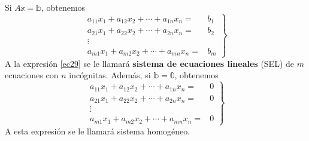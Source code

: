 \begin{definition}
    Si $A\mathbb{x} = \mathbb{b}$, obtenemos
    \begin{equation}
        \left. \begin{array}{rl}
            a_{11}x_1 + a_{12}x_2 + \cdots + a_{1n}x_n = & \!\!\!\! b_1 \\
            a_{21}x_1 + a_{22}x_2 + \cdots + a_{2n}x_n = & \!\!\!\! b_2 \\
            \vdots \hspace{1cm}  \\
            a_{m1}x_1 + a_{m2}x_2 + \cdots + a_{mn}x_n = & \!\!\!\! b_m
        \end{array} \!\!\right\} \label{ec29}
    \end{equation}
    A la expresión \eqref{ec29} se le llamará \textbf{sistema de ecuaciones lineales} (SEL) de $m$ ecuaciones con $n$ incógnitas. Además, si $\mathbb{b} = \mathbb{0}$, obtenemos
    \begin{equation*}
        \left. \begin{array}{rl}
            a_{11}x_1 + a_{12}x_2 + \cdots + a_{1n}x_n = & \!\!\!\! 0 \\
            a_{21}x_1 + a_{22}x_2 + \cdots + a_{2n}x_n = & \!\!\!\! 0 \\
            \vdots \hspace{1cm}  \\
            a_{m1}x_1 + a_{m2}x_2 + \cdots + a_{mn}x_n = & \!\!\!\! 0
        \end{array} \!\!\right\}
    \end{equation*}
    A esta expresión se le llamará sistema homogéneo.
\end{definition}

